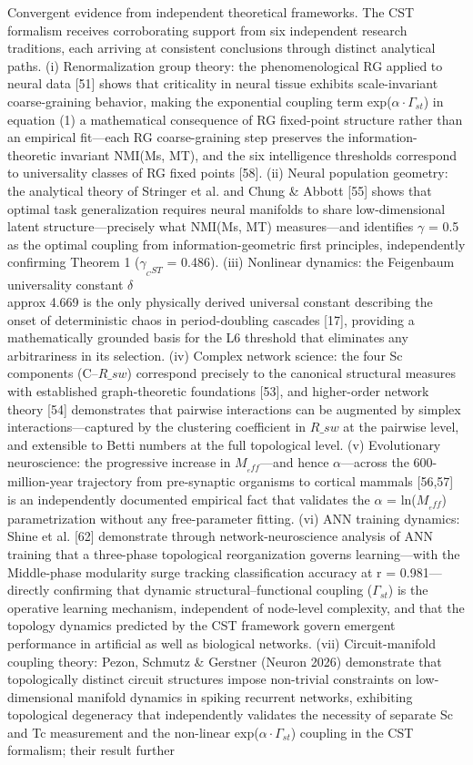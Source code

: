 \documentclass[a4paper,12pt]{article}
\begin{document}
Convergent evidence from independent theoretical frameworks. The CST formalism receives corroborating support from six independent research traditions, each arriving at consistent conclusions through distinct analytical paths. (i) Renormalization group theory: the phenomenological RG applied to neural data [51] shows that criticality in neural tissue exhibits scale-invariant coarse-graining behavior, making the exponential coupling term exp($\alpha \cdot \Gamma_{st}$) in equation (1) a mathematical consequence of RG fixed-point structure rather than an empirical fit---each RG coarse-graining step preserves the information-theoretic invariant NMI(Ms, MT), and the six intelligence thresholds correspond to universality classes of RG fixed points [58]. (ii) Neural population geometry: the analytical theory of Stringer et al. and Chung \& Abbott [55] shows that optimal task generalization requires neural manifolds to share low-dimensional latent structure---precisely what NMI(Ms, MT) measures---and identifies $\gamma$ = 0.5 as the optimal coupling from information-geometric first principles, independently confirming Theorem 1 ($\gamma_{_CST}$ = 0.486). (iii) Nonlinear dynamics: the Feigenbaum universality constant $\delta$  \\approx  4.669 is the only physically derived universal constant describing the onset of deterministic chaos in period-doubling cascades [17], providing a mathematically grounded basis for the L6 threshold that eliminates any arbitrariness in its selection. (iv) Complex network science: the four Sc components (C--$R\_{sw}$) correspond precisely to the canonical structural measures with established graph-theoretic foundations [53], and higher-order network theory [54] demonstrates that pairwise interactions can be augmented by simplex interactions---captured by the clustering coefficient in $R\_{sw}$ at the pairwise level, and extensible to Betti numbers at the full topological level. (v) Evolutionary neuroscience: the progressive increase in $M_{_eff}$---and hence $\alpha$---across the 600-million-year trajectory from pre-synaptic organisms to cortical mammals [56,57] is an independently documented empirical fact that validates the $\alpha$ = ln($M_{_eff}$) parametrization without any free-parameter fitting. (vi) ANN training dynamics: Shine et al. [62] demonstrate through network-neuroscience analysis of ANN training that a three-phase topological reorganization governs learning---with the Middle-phase modularity surge tracking classification accuracy at r = 0.981---directly confirming that dynamic structural--functional coupling ($\Gamma_{st}$) is the operative learning mechanism, independent of node-level complexity, and that the topology dynamics predicted by the CST framework govern emergent performance in artificial as well as biological networks. (vii) Circuit-manifold coupling theory: Pezon, Schmutz & Gerstner (Neuron 2026) demonstrate that topologically distinct circuit structures impose non-trivial constraints on low-dimensional manifold dynamics in spiking recurrent networks, exhibiting topological degeneracy that independently validates the necessity of separate Sc and Tc measurement and the non-linear exp($\alpha \cdot \Gamma_{st}$) coupling in the CST formalism; their result further 
\end{document}
